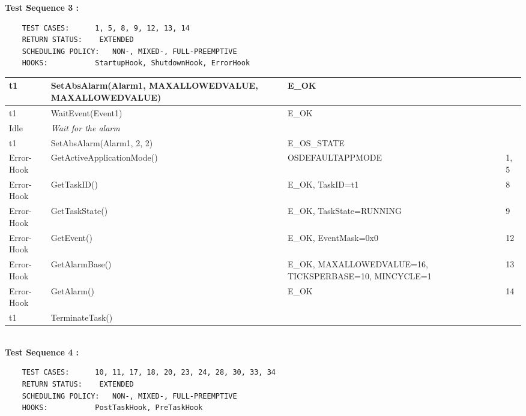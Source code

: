 \documentclass[10pt]{article}
\newlength{\Li}\settowidth{\Li}{Running}
\newlength{\Lii}\setlength{\Lii}{7cm}
\newlength{\Liiii}\setlength{\Liiii}{0.9cm}
\newlength{\Liii}\setlength{\Liii}{\textwidth} \addtolength{\Liii}{-\Li} \addtolength{\Liii}{-\Lii} \addtolength{\Liii}{-\Liiii}
\begin{document}
	\textbf{Test Sequence 3 :}
	\begin{lstlisting}
	TEST CASES:		 1, 5, 8, 9, 12, 13, 14
	RETURN STATUS:	  EXTENDED
	SCHEDULING POLICY:   NON-, MIXED-, FULL-PREEMPTIVE
	HOOKS:			 StartupHook, ShutdownHook, ErrorHook
	\end{lstlisting}
	
	
	\begin{supertabular}{|p{\Li}|p{\Lii}|p{\Liii}|p{\Liiii}|} \hline 
	t1			& SetAbsAlarm(Alarm1, MAXALLOWEDVALUE, MAXALLOWEDVALUE)	& E\_OK							& \\ \hline
	t1			& WaitEvent(Event1)												& E\_OK							& \\ \hline
	Idle				& \textit{Wait for the alarm}											&								&\\ \hline
	t1			& SetAbsAlarm(Alarm1, 2, 2)										& E\_OS\_STATE					& \\ \hline
	Error-Hook		& GetActiveApplicationMode()									& OSDEFAULTAPPMODE			& 1, 5 \\ \hline
	Error-Hook		& GetTaskID()												& E\_OK, TaskID=t1				& 8 \\ \hline	
	Error-Hook		& GetTaskState()											& E\_OK, TaskState=RUNNING		& 9 \\ \hline	
	Error-Hook		& GetEvent()												& E\_OK, EventMask=0x0				& 12 \\ \hline	
	Error-Hook		& GetAlarmBase()											& E\_OK, MAXALLOWEDVALUE=16, TICKSPERBASE=10, MINCYCLE=1							& 13 \\ \hline
	Error-Hook		& GetAlarm()												& E\_OK						& 14 \\ \hline	
	t1			& TerminateTask()												& 								& \\ \hline
	\end{supertabular}\\	
	
	\textbf{Test Sequence 4 :}
	\begin{lstlisting}
	TEST CASES:		 10, 11, 17, 18, 20, 23, 24, 28, 30, 33, 34
	RETURN STATUS:	  EXTENDED
	SCHEDULING POLICY:   NON-, MIXED-, FULL-PREEMPTIVE
	HOOKS:			 PostTaskHook, PreTaskHook
	\end{lstlisting}
	
	
\end{document}
